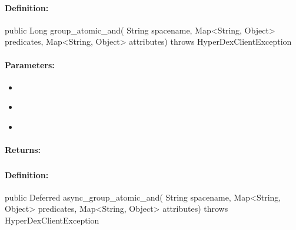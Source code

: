 \paragraph{Definition:}
\begin{javacode}
public Long group_atomic_and(
        String spacename,
        Map<String, Object> predicates,
        Map<String, Object> attributes) throws HyperDexClientException
\end{javacode}

\paragraph{Parameters:}
\begin{itemize}[noitemsep]
\item {}\\

\item {}\\

\item {}\\

\end{itemize}

\paragraph{Returns:}


\pagebreak
\subsubsection{}
\label{api:java:async_group_atomic_and}


\paragraph{Definition:}
\begin{javacode}
public Deferred async_group_atomic_and(
        String spacename,
        Map<String, Object> predicates,
        Map<String, Object> attributes) throws HyperDexClientException
\end{javacode}

